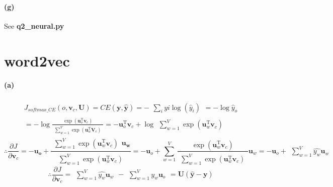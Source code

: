 \documentclass{article}
\begin{document}
\begin{spacing}{1.5}
\paragraph{(g)} See \textbf{q2\_neural.py}

\section{word2vec}
\paragraph{(a)} 
\begin{equation}
\begin{split}
J_{softmax\_CE}(o,\boldsymbol{v}_c,\boldsymbol{U})=CE(\boldsymbol{y},\boldsymbol{\widehat{y}})=-\begin{matrix} \sum_{i}y{i}\log(\widehat{y}_i)\end{matrix}=-\log\widehat{y}_o \\
=-\log \frac{\exp(\boldsymbol{u}_o ^\mathrm{T}\boldsymbol{v}_c)}{\begin{matrix} \sum_{w=1}^V\exp(\boldsymbol{u}_w ^\mathrm{T}\boldsymbol{V}_c) \end{matrix}} 
=-\boldsymbol{u}_o ^\mathrm{T}\boldsymbol{v}_c+\log \begin{matrix} \sum_{w=1}^V\exp(\boldsymbol{u}_w ^\mathrm{T}\boldsymbol{v}_c) \end{matrix} 
\end{split}
\end{equation}
\begin{equation}
\boldsymbol{\therefore}
\frac {\partial J}{\partial \boldsymbol{v}_c}=-\boldsymbol{u_o}+\frac{\begin{matrix} \sum_{w=1}^V\exp(\boldsymbol{u}_w ^\mathrm{T}\boldsymbol{v}_c) \end{matrix} \boldsymbol{u_w}}{\begin{matrix} \sum_{w=1}^V\exp(\boldsymbol{u}_w ^\mathrm{T}\boldsymbol{v}_c) \end{matrix}}
=-\boldsymbol{u}_o+\sum_{w=1}^V\frac{\exp(\boldsymbol{u}_w ^\mathrm{T}\boldsymbol{v}_c)}{\begin{matrix} \sum_{w=1}^V\exp(\boldsymbol{u}_w ^\mathrm{T}\boldsymbol{v}_c) \end{matrix}}\boldsymbol{u}_w
=-\boldsymbol{u}_o+\begin{matrix} \sum_{w=1}^V\widehat{y_w}\boldsymbol{u}_w \end{matrix}
\end{equation}
\begin{equation}
\boldsymbol{\therefore}
\frac {\partial J}{\partial \boldsymbol{v}_c}= \begin{matrix} \sum_{w=1}^V\widehat{y_w}\boldsymbol{u}_w \end{matrix} - \begin{matrix} \sum_{w=1}^Vy_{w}\boldsymbol{u}_o \end{matrix}=\boldsymbol{U}(\boldsymbol{\widehat{y}}-\boldsymbol{y})
\end{equation}

\end{spacing}
\end{document}

